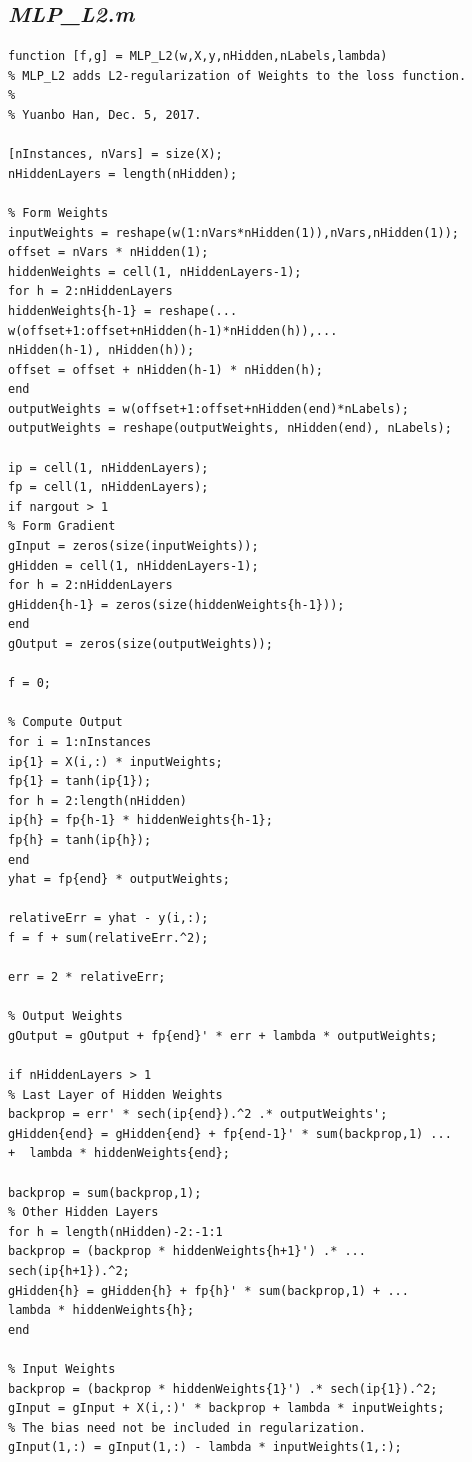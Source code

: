 \documentclass{article}
\begin{document}
\subsection{\emph{MLP\_L2.m}}
\begin{lstlisting}
function [f,g] = MLP_L2(w,X,y,nHidden,nLabels,lambda)
% MLP_L2 adds L2-regularization of Weights to the loss function.
%
% Yuanbo Han, Dec. 5, 2017.

[nInstances, nVars] = size(X);
nHiddenLayers = length(nHidden);

% Form Weights
inputWeights = reshape(w(1:nVars*nHidden(1)),nVars,nHidden(1));
offset = nVars * nHidden(1);
hiddenWeights = cell(1, nHiddenLayers-1);
for h = 2:nHiddenLayers
hiddenWeights{h-1} = reshape(...
w(offset+1:offset+nHidden(h-1)*nHidden(h)),...
nHidden(h-1), nHidden(h));
offset = offset + nHidden(h-1) * nHidden(h);
end
outputWeights = w(offset+1:offset+nHidden(end)*nLabels);
outputWeights = reshape(outputWeights, nHidden(end), nLabels);

ip = cell(1, nHiddenLayers);
fp = cell(1, nHiddenLayers);
if nargout > 1
% Form Gradient
gInput = zeros(size(inputWeights));
gHidden = cell(1, nHiddenLayers-1);
for h = 2:nHiddenLayers
gHidden{h-1} = zeros(size(hiddenWeights{h-1}));
end
gOutput = zeros(size(outputWeights));

f = 0;

% Compute Output
for i = 1:nInstances
ip{1} = X(i,:) * inputWeights;
fp{1} = tanh(ip{1});
for h = 2:length(nHidden)
ip{h} = fp{h-1} * hiddenWeights{h-1};
fp{h} = tanh(ip{h});
end
yhat = fp{end} * outputWeights;

relativeErr = yhat - y(i,:);
f = f + sum(relativeErr.^2);

err = 2 * relativeErr;

% Output Weights
gOutput = gOutput + fp{end}' * err + lambda * outputWeights;

if nHiddenLayers > 1
% Last Layer of Hidden Weights
backprop = err' * sech(ip{end}).^2 .* outputWeights';
gHidden{end} = gHidden{end} + fp{end-1}' * sum(backprop,1) ...
+  lambda * hiddenWeights{end};

backprop = sum(backprop,1);
% Other Hidden Layers
for h = length(nHidden)-2:-1:1
backprop = (backprop * hiddenWeights{h+1}') .* ...
sech(ip{h+1}).^2;
gHidden{h} = gHidden{h} + fp{h}' * sum(backprop,1) + ...
lambda * hiddenWeights{h};
end

% Input Weights
backprop = (backprop * hiddenWeights{1}') .* sech(ip{1}).^2;
gInput = gInput + X(i,:)' * backprop + lambda * inputWeights;
% The bias need not be included in regularization.
gInput(1,:) = gInput(1,:) - lambda * inputWeights(1,:);


\end{lstlisting}
\end{document}
